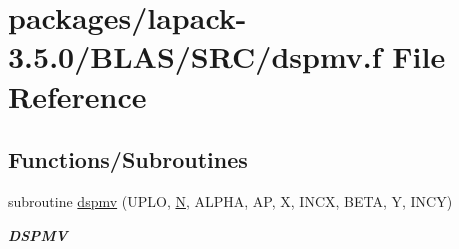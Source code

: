 \hypertarget{lapack-3_85_80_2BLAS_2SRC_2dspmv_8f}{}\section{packages/lapack-\/3.5.0/\+B\+L\+A\+S/\+S\+R\+C/dspmv.f File Reference}
\label{lapack-3_85_80_2BLAS_2SRC_2dspmv_8f}
\subsection*{Functions/\+Subroutines}
\begin{DoxyCompactItemize}
\item 
subroutine \hyperlink{group__double__blas__level2_gab746575c4f7dd4eec72e8110d42cefe9}{dspmv} (U\+P\+L\+O, \hyperlink{polmisc_8c_a0240ac851181b84ac374872dc5434ee4}{N}, A\+L\+P\+H\+A, A\+P, X, I\+N\+C\+X, B\+E\+T\+A, Y, I\+N\+C\+Y)
\begin{DoxyCompactList}\small\item\em {\bfseries D\+S\+P\+M\+V} \end{DoxyCompactList}\end{DoxyCompactItemize}
